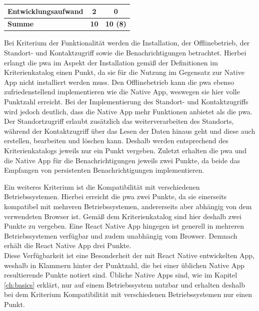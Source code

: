 \begin{table}[ht]
\begin{tabular}{|l|l|c|c|}
\multicolumn{2}{|l|}{Entwicklungsaufwand}                                                                 & 2            & 0                                                                                \\ \hline
\multicolumn{2}{|l|}{\textbf{Summe}}                                                                      & \textbf{10}  & \textbf{10 (8)}
\\ \hline
\end{tabular}
\label{fig:discussion_impl}
\end{table}

Bei Kriterium der Funktionalität werden die Installation, der Offlinebetrieb, der Standort- und Kontaktzugriff sowie die Benachrichtigungen betrachtet.
Hierbei erlangt die \ac{pwa} im Aspekt der Installation gemäß der Definitionen im Kriterienkatalog einen Punkt, da sie für die Nutzung im Gegensatz zur Native App nicht installiert werden muss.
Den Offlinebetrieb  kann die \ac{pwa} ebenso zufriedenstellend implementieren wie die Native App, weswegen sie hier volle Punktzahl erreicht.
Bei der Implementierung des Standort- und Kontaktzugriffs wird jedoch deutlich, dass die Native App mehr Funktionen anbietet als die \ac{pwa}.
Der Standortzugriff erlaubt zusätzlich das weiterverarbeiten des Standorts, während der Kontaktzugriff über das Lesen der Daten hinaus geht und diese auch erstellen, bearbeiten und löschen kann.
Deshalb werden entsprechend des Kriterienkatalogs jeweils nur ein Punkt vergeben.
Zuletzt erhalten die \ac{pwa} und die Native App für die Benachrichtigungen jeweils zwei Punkte, da beide das Empfangen von persistenten Benachrichtigungen implementieren.

Ein weiteres Kriterium ist die Kompatibilität mit verschiedenen Betriebssystemen.
Hierbei erreicht die \ac{pwa} zwei Punkte, da sie einerseits kompatibel mit mehreren Betriebssystemen, andererseits aber abhängig von dem verwendeten Browser ist.
Gemäß dem Kriterienkatalog sind hier deshalb zwei Punkte zu vergeben.
Eine React Native App hingegen ist generell in mehreren Betriebssystemen verfügbar und zudem unabhängig vom Browser.
Demnach erhält die React Native App drei Punkte.\\
Diese Verfügbarkeit ist eine Besonderheit der mit React Native entwickelten App, weshalb in Klammern hinter der Punktzahl, die bei einer üblichen Native App resultierende Punkte notiert sind.
Übliche Native Apps sind, wie im Kapitel \ref{ch:basics} erklärt, nur auf einem Betriebssystem nutzbar und erhalten deshalb bei dem Kriterium Kompatibilität mit verschiedenen Betriebssystemen nur einen Punkt.

